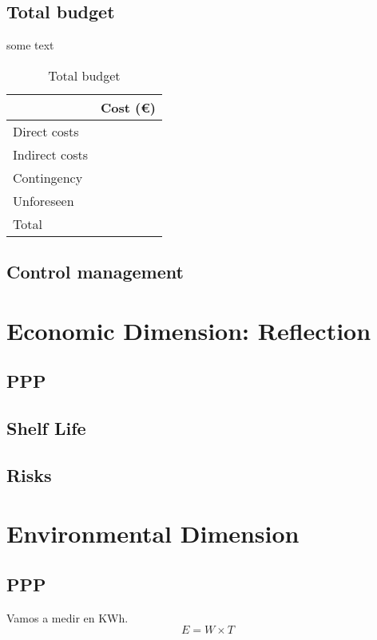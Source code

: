 \subsection{Total budget}
some text
\begin{table}[h!]
	\centering
	\begin{tabular}{l|r|}
		\cline{2-2}
		& \multicolumn{1}{l|}{Cost (€)} \\ \hline
		\multicolumn{1}{|l|}{Direct costs}   &                               \\ \hline
		\multicolumn{1}{|l|}{Indirect costs} &                               \\ \hline
		\multicolumn{1}{|l|}{Contingency}    &                               \\ \hline
		\multicolumn{1}{|l|}{Unforeseen}     &                               \\ \hline\hline
		\multicolumn{1}{|l|}{Total}          &                               \\ \hline
	\end{tabular}
	\caption{Total budget}
	\label{TotalBudget}
\end{table}
\subsection{Control management}

\section{Economic Dimension: Reflection}
\subsection{PPP}
\subsection{Shelf Life}
\subsection{Risks}

\section{Environmental Dimension }
\subsection{PPP}
Vamos a medir en KWh.
$$E=W\times T$$
